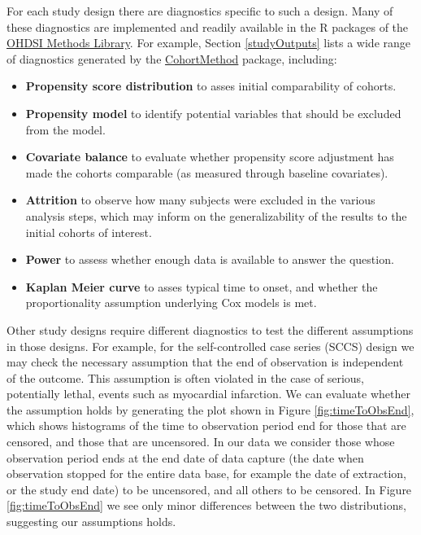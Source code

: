 \documentclass[11pt]{book}
\providecommand{\tightlist}{%
  \setlength{\itemsep}{0pt}\setlength{\parskip}{0pt}}
\theoremstyle{definition}
\theoremstyle{definition}
\theoremstyle{definition}
\theoremstyle{remark}
\begin{document}

For each study design there are diagnostics specific to such a design.
Many of these diagnostics are implemented and readily available in the R
packages of the \href{https://ohdsi.github.io/MethodsLibrary/}{OHDSI
Methods Library}. For example, Section \ref{studyOutputs} lists a wide
range of diagnostics generated by the
\href{https://ohdsi.github.io/CohortMethod/}{CohortMethod} package,
including:

\begin{itemize}
\tightlist
\item
  \textbf{Propensity score distribution} to asses initial comparability
  of cohorts.
\item
  \textbf{Propensity model} to identify potential variables that should
  be excluded from the model.
\item
  \textbf{Covariate balance} to evaluate whether propensity score
  adjustment has made the cohorts comparable (as measured through
  baseline covariates).
\item
  \textbf{Attrition} to observe how many subjects were excluded in the
  various analysis steps, which may inform on the generalizability of
  the results to the initial cohorts of interest.
\item
  \textbf{Power} to assess whether enough data is available to answer
  the question.
\item
  \textbf{Kaplan Meier curve} to asses typical time to onset, and
  whether the proportionality assumption underlying Cox models is met.
\end{itemize}

Other study designs require different diagnostics to test the different
assumptions in those designs. For example, for the self-controlled case
series (SCCS) design we may check the necessary assumption that the end
of observation is independent of the outcome. This assumption is often
violated in the case of serious, potentially lethal, events such as
myocardial infarction. We can evaluate whether the assumption holds by
generating the plot shown in Figure \ref{fig:timeToObsEnd}, which shows
histograms of the time to observation period end for those that are
censored, and those that are uncensored. In our data we consider those
whose observation period ends at the end date of data capture (the date
when observation stopped for the entire data base, for example the date
of extraction, or the study end date) to be uncensored, and all others
to be censored. In Figure \ref{fig:timeToObsEnd} we see only minor
differences between the two distributions, suggesting our assumptions
holds.
\end{document}
